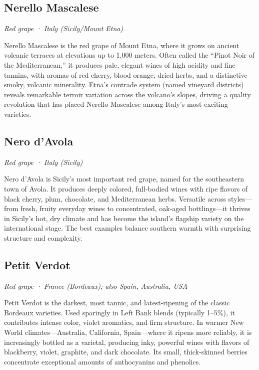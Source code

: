 \subsection*{Nerello Mascalese}
\textit{Red grape · Italy (Sicily/Mount Etna)}\par\smallskip

Nerello Mascalese is the red grape of Mount Etna, where it grows on ancient volcanic terraces at elevations up to 1,000 meters. Often called the “Pinot Noir of the Mediterranean,” it produces pale, elegant wines of high acidity and fine tannins, with aromas of red cherry, blood orange, dried herbs, and a distinctive smoky, volcanic minerality. Etna’s contrade system (named vineyard districts) reveals remarkable terroir variation across the volcano’s slopes, driving a quality revolution that has placed Nerello Mascalese among Italy’s most exciting varieties.

\subsection*{Nero d’Avola}
\textit{Red grape · Italy (Sicily)}\par\smallskip

Nero d’Avola is Sicily’s most important red grape, named for the southeastern town of Avola. It produces deeply colored, full-bodied wines with ripe flavors of black cherry, plum, chocolate, and Mediterranean herbs. Versatile across styles—from fresh, fruity everyday wines to concentrated, oak-aged bottlings—it thrives in Sicily’s hot, dry climate and has become the island’s flagship variety on the international stage. The best examples balance southern warmth with surprising structure and complexity.

\subsection*{Petit Verdot}
\textit{Red grape · France (Bordeaux); also Spain, Australia, USA}\par\smallskip

Petit Verdot is the darkest, most tannic, and latest-ripening of the classic Bordeaux varieties. Used sparingly in Left Bank blends (typically 1–5\%), it contributes intense color, violet aromatics, and firm structure. In warmer New World climates—Australia, California, Spain—where it ripens more reliably, it is increasingly bottled as a varietal, producing inky, powerful wines with flavors of blackberry, violet, graphite, and dark chocolate. Its small, thick-skinned berries concentrate exceptional amounts of anthocyanins and phenolics.

